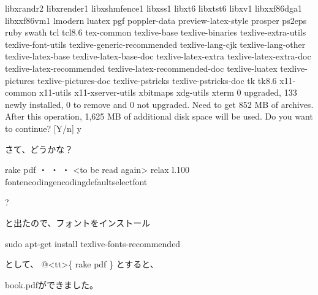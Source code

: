 \begin{reviewemlist}
  libxrandr2 libxrender1 libxshmfence1 libxss1 libxt6 libxtst6 libxv1
  libxxf86dga1 libxxf86vm1 lmodern luatex pgf poppler{-}data preview{-}latex{-}style
  prosper ps2eps ruby swath tcl tcl8.6 tex{-}common texlive{-}base
  texlive{-}binaries texlive{-}extra{-}utils texlive{-}font{-}utils
  texlive{-}generic{-}recommended texlive{-}lang{-}cjk texlive{-}lang{-}other
  texlive{-}latex{-}base texlive{-}latex{-}base{-}doc texlive{-}latex{-}extra
  texlive{-}latex{-}extra{-}doc texlive{-}latex{-}recommended
  texlive{-}latex{-}recommended{-}doc texlive{-}luatex texlive{-}pictures
  texlive{-}pictures{-}doc texlive{-}pstricks texlive{-}pstricks{-}doc tk tk8.6
  x11{-}common x11{-}utils x11{-}xserver{-}utils xbitmaps xdg{-}utils xterm
0 upgraded, 133 newly installed, 0 to remove and 0 not upgraded.
Need to get 852 MB of archives.
After this operation, 1,625 MB of additional disk space will be used.
Do you want to continue? [Y/n] y
\end{reviewemlist}

さて、どうかな？

\begin{reviewemlist}
\textdollar{} rake pdf
・
・
・
\textless{}to be read again\textgreater{}
                   relax
l.100 \reviewbackslash{}fontencoding\reviewbackslash{}encodingdefault\reviewbackslash{}selectfont

?
\end{reviewemlist}

と出たので、フォントをインストール

\begin{reviewemlist}
\textdollar{} sudo apt{-}get install texlive{-}fonts{-}recommended
\end{reviewemlist}

として、
@\textless{}tt\textgreater{}\{
rake pdf
\}
とすると、

book.pdfができました。
